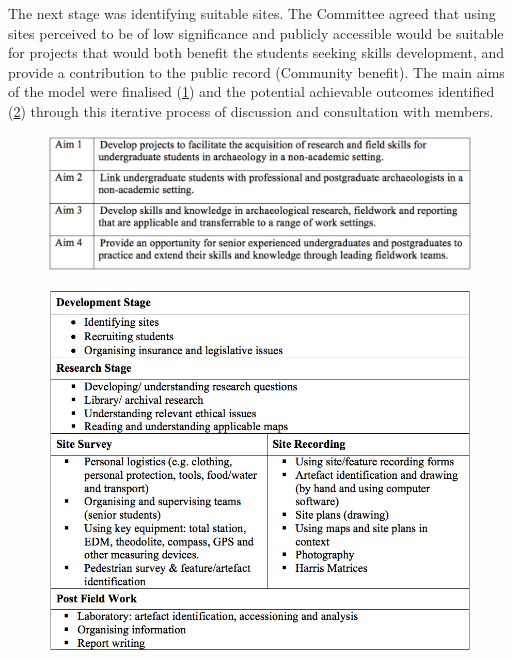 \documentclass[%
]{ijsra}
\begin{document}
	The next stage was identifying suitable sites. The Committee agreed that using sites perceived to be of low significance and publicly accessible would be suitable for projects that would both benefit the students seeking skills development, and provide a contribution to the public record (Community benefit). 
	The main aims of the model were finalised (\cref{fig:Fyfe-Table01}) and the potential achievable outcomes identified (\cref{fig:Fyfe-Table02}) through this iterative process of discussion and consultation with members.
	
	\begin{figure} %
		\includegraphics[width=\linewidth]{figures/Fyfe-Table01}
		\centering
		\label{fig:Fyfe-Table01}
	\end{figure}	
	
	\begin{figure} %
		\includegraphics[width=\linewidth]{figures/Fyfe-Table02}
		\centering
		\label{fig:Fyfe-Table02}
	\end{figure}
	
\end{document}
